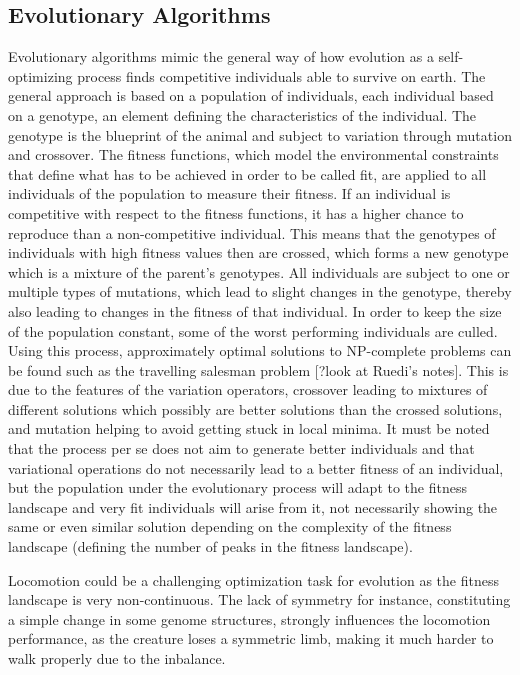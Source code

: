 \documentclass[main]{subfiles}
\begin{document}
\subsection{Evolutionary Algorithms}

Evolutionary algorithms mimic the general way of how evolution as a self-optimizing process finds competitive individuals able to survive on earth. The general approach is based on a population of individuals, each individual based on a genotype, an element defining the characteristics of the individual. The genotype is the blueprint of the animal and subject to variation through mutation and crossover. The fitness functions, which model the environmental constraints that define what has to be achieved in order to be called fit, are applied to all individuals of the population to measure their fitness. If an individual is competitive with respect to the fitness functions, it has a higher chance to reproduce than a non-competitive individual. This means that the genotypes of individuals with high fitness values then are crossed, which forms a new genotype which is a mixture of the parent's genotypes. All individuals are subject to one or multiple types of mutations, which lead to slight changes in the genotype, thereby also leading to changes in the fitness of that individual. In order to keep the size of the population constant, some of the worst performing individuals are culled. Using this process, approximately optimal solutions to NP-complete problems can be found such as the travelling salesman problem [?look at Ruedi's notes]. This is due to the features of the variation operators, crossover leading to mixtures of different solutions which possibly are better solutions than the crossed solutions, and mutation helping to avoid getting stuck in local minima. It must be noted that the process per se does not aim to generate better individuals and that variational operations do not necessarily lead to a better fitness of an individual, but the population under the evolutionary process will adapt to the fitness landscape and very fit individuals will arise from it, not necessarily showing the same or even similar solution depending on the complexity of the fitness landscape (defining the number of peaks in the fitness landscape). 

Locomotion could be a challenging optimization task for evolution as the fitness landscape is very non-continuous. The lack of symmetry for instance, constituting a simple change in some genome structures, strongly influences the locomotion performance, as the creature loses a symmetric limb, making it much harder to walk properly due to the inbalance.
\end{document}
